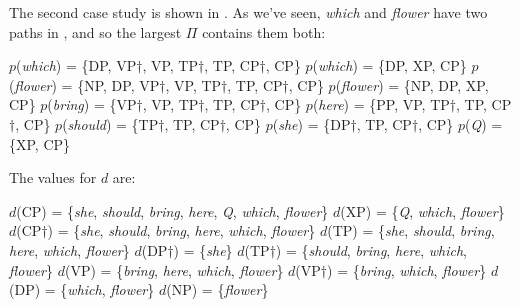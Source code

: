 \documentclass[output=paper]{langsci/langscibook}
\begin{document}
%

The second case study is shown in . As we've seen, \emph{which} and \emph{flower} have two paths in , and so the largest $\Pi$ contains them both:

\begin{exe}
	\ex \label{ex:bigpimulti3}
	\begin{xlist}
		\ex $p$(\emph{which}) = \{DP, VP$\dag$, VP, TP$\dag$, TP, CP$\dag$, CP\}
		\ex $p$(\emph{which}) = \{DP, XP, CP\}
		\ex $p$(\emph{flower}) = \{NP, DP, VP$\dag$, VP, TP$\dag$, TP, CP$\dag$, CP\}
		\ex $p$(\emph{flower}) = \{NP, DP, XP, CP\}
		\ex $p$(\emph{bring}) = \{VP$\dag$, VP, TP$\dag$, TP, CP$\dag$, CP\}
		\ex $p$(\emph{here}) = \{PP, VP, TP$\dag$, TP, CP$\dag$, CP\}
		\ex $p$(\emph{should}) = \{TP$\dag$, TP, CP$\dag$, CP\}
		\ex $p$(\emph{she}) = \{DP$\dag$, TP, CP$\dag$, CP\}
		\ex $p$(\emph{Q}) = \{XP, CP\}
	\end{xlist}
\end{exe}

The values for $d$ are:
\begin{exe}
	\ex \label{ex:bigdmulti3}
	\begin{xlist}
		\ex $d$(CP) = \{\emph{she}, \emph{should}, \emph{bring}, \emph{here}, \emph{Q}, \emph{which}, \emph{flower}\}
		\ex \label{ex:bdmulti3xp}$d$(XP) = \{\emph{Q}, \emph{which}, \emph{flower}\}
		\ex $d$(CP$\dag$) = \{\emph{she}, \emph{should}, \emph{bring}, \emph{here}, \emph{which}, \emph{flower}\}
		\ex $d$(TP) = \{\emph{she}, \emph{should}, \emph{bring}, \emph{here}, \emph{which}, \emph{flower}\}
		\ex $d$(DP$\dag$) = \{\emph{she}\}
		\ex $d$(TP$\dag$) = \{\emph{should}, \emph{bring}, \emph{here}, \emph{which}, \emph{flower}\}
		\ex \label{ex:vp} $d$(VP) = \{\emph{bring}, \emph{here}, \emph{which}, \emph{flower}\}
		\ex \label{ex:vpdag}$d$(VP$\dag$) = \{\emph{bring}, \emph{which}, \emph{flower}\}
		\ex $d$(DP) = \{\emph{which}, \emph{flower}\}
		\ex $d$(NP) = \{\emph{flower}\}
	\end{xlist}
\end{exe}
\end{document}
